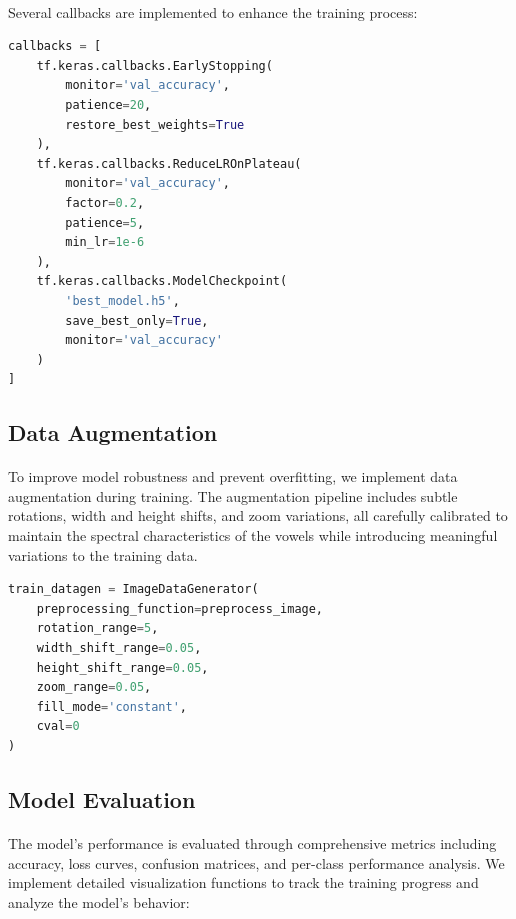\paragraph{}
Several callbacks are implemented to enhance the training process:

\begin{lstlisting}[language=Python, caption={Training Callbacks Configuration}]
callbacks = [
    tf.keras.callbacks.EarlyStopping(
        monitor='val_accuracy',
        patience=20,
        restore_best_weights=True
    ),
    tf.keras.callbacks.ReduceLROnPlateau(
        monitor='val_accuracy',
        factor=0.2,
        patience=5,
        min_lr=1e-6
    ),
    tf.keras.callbacks.ModelCheckpoint(
        'best_model.h5',
        save_best_only=True,
        monitor='val_accuracy'
    )
]
\end{lstlisting}

\subsection{Data Augmentation}
\label{subsec:data-augmentation}

\paragraph{}
To improve model robustness and prevent overfitting, we implement data augmentation during training. The augmentation pipeline includes subtle rotations, width and height shifts, and zoom variations, all carefully calibrated to maintain the spectral characteristics of the vowels while introducing meaningful variations to the training data.

\begin{lstlisting}[language=Python, caption={Data Augmentation Configuration}]
train_datagen = ImageDataGenerator(
    preprocessing_function=preprocess_image,
    rotation_range=5,
    width_shift_range=0.05,
    height_shift_range=0.05,
    zoom_range=0.05,
    fill_mode='constant',
    cval=0
)
\end{lstlisting}

\subsection{Model Evaluation}
\label{subsec:model-evaluation}

\paragraph{}
The model's performance is evaluated through comprehensive metrics including accuracy, loss curves, confusion matrices, and per-class performance analysis. We implement detailed visualization functions to track the training progress and analyze the model's behavior:


